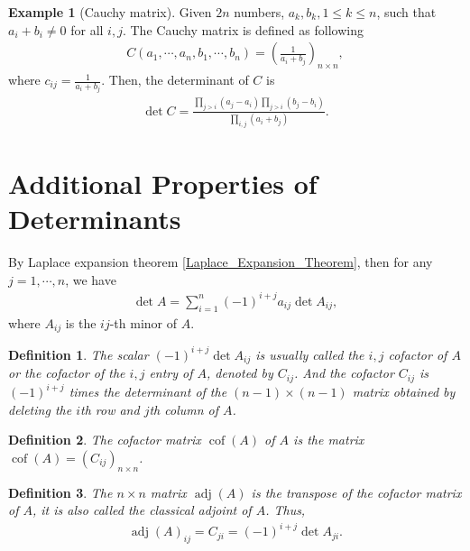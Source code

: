 \documentclass[10pt]{book}
\newtheorem{definition}{Definition}[chapter]
\theoremstyle{definition}
\newtheorem{example}{Example}[chapter]
\numberwithin{equation}{chapter}
\begin{document}
\medskip

\begin{example}[Cauchy matrix]
Given $2n$ numbers, $a_k, b_k, 1\leq k\leq n$, such that $a_i + b_i \neq 0$ for all $i,j$. The Cauchy matrix is defined as following
\begin{align*}
    C(a_1,\cdots,a_n, b_1,\cdots,b_n) = \left(\frac{1}{a_i + b_j}\right)_{n\times n}
,\end{align*}
where $c_{ij} = \frac{1}{a_i + b_j}$. Then, the determinant of $C$ is 
\begin{align*}
    \det C = \frac{\prod_{j>i}(a_j - a_i)\prod_{j>i}(b_j - b_i)}{\prod_{i,j}(a_i + b_j)}.
\end{align*}
\end{example}

\medskip

\section{Additional Properties of Determinants}
By Laplace expansion theorem \ref{Laplace_Expansion_Theorem}, then for any $j = 1, \cdots, n$, we have
\begin{align*}
    \det A = \sum^n_{i=1} (-1)^{i+j} a_{ij} \det A_{ij},
\end{align*}
where $A_{ij}$ is the $ij$-th minor of $A$.

\medskip

\begin{definition}
The scalar $(-1)^{i+j} \det A_{ij}$ is usually called the $i,j$ cofactor of $A$ or the cofactor of the $i,j$ entry of $A$, denoted by $C_{ij}$. And the cofactor $C_{ij}$ is $(-1)^{i+j}$ times the determinant of the $(n-1) \times (n-1)$ matrix obtained by deleting the $i$th row and $j$th column of $A$.
\end{definition}

\medskip

\begin{definition}
The cofactor matrix $\operatorname{cof}(A)$ of $A$ is the matrix $\operatorname{cof}(A) = \left(C_{ij}\right)_{n \times n}$.
\end{definition}

\medskip

\begin{definition}
The $n \times n$ matrix $\operatorname{adj}(A)$ is the transpose of the cofactor matrix of $A$, it is also called the classical adjoint of $A$. Thus, 
\begin{align*}
    \operatorname{adj}(A)_{ij} = C_{ji} = (-1)^{i+j} \det A_{ji}.
\end{align*}
\end{definition}
\end{document}
